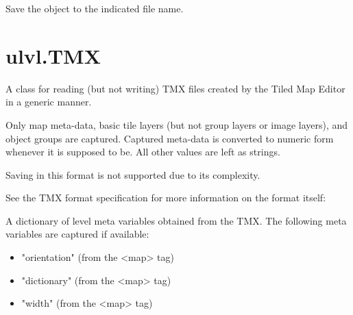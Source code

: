 \documentclass[letterpaper,10pt,english]{sphinxmanual}
\begin{document}
\begin{fulllineitems}
\label{\detokenize{index:ulvl.ULX.save}}
Save the object to the indicated file name.

\end{fulllineitems}



\section{ulvl.TMX}
\label{\detokenize{index:ulvl-tmx}}

\begin{fulllineitems}
\label{\detokenize{index:ulvl.TMX}}
A class for reading (but not writing) TMX files created by the Tiled
Map Editor in a generic manner.

Only map meta-data, basic tile layers (but not group layers or image
layers), and object groups are captured.  Captured meta-data is
converted to numeric form whenever it is supposed to be.  All other
values are left as strings.

Saving in this format is not supported due to its complexity.

See the TMX format specification for more information on the format
itself:


\begin{fulllineitems}
\label{\detokenize{index:ulvl.TMX.meta}}
A dictionary of level meta variables obtained from the TMX.  The
following meta variables are captured if available:
\begin{itemize}
\item {} 
"orientation" (from the \textless{}map\textgreater{} tag)

\item {} 
"dictionary" (from the \textless{}map\textgreater{} tag)

\item {} 
"width" (from the \textless{}map\textgreater{} tag)


\end{itemize}
\end{fulllineitems}
\end{fulllineitems}
\end{document}
